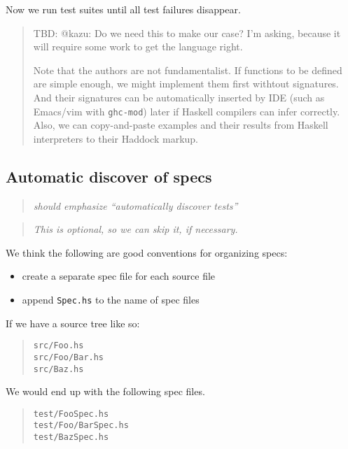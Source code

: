 \documentclass[preprint]{sigplanconf}
\begin{document}
\noindent Now we run test suites until
all test failures disappear.

\begin{quote}
    TBD: @kazu: Do we need this to make our case?  I'm asking, because
    it will require some work to get the language right.

    Note that the authors are not fundamentalist.  If functions to be
    defined are simple enough, we might implement them first withtout
    signatures.  And their signatures can be automatically inserted by
    IDE (such as Emacs/vim with {\tt ghc-mod}) later if Haskell
    compilers can infer correctly.  Also, we can copy-and-paste
    examples and their results from Haskell interpreters to their
    Haddock markup.
\end{quote}

\subsection{Automatic discover of specs}

\begin{quote}
    \emph{should emphasize ``automatically discover tests''}
\end{quote}

\begin{quote}
\emph{This is optional, so we can skip it, if necessary.}
\end{quote}

\noindent We think the following are good conventions for organizing specs:
\begin{itemize}
    \item create a separate spec file for each source file
    \item append {\tt Spec.hs} to the name of spec files
\end{itemize}

\noindent If we have a source tree like so:

\begin{quote}
\small
\begin{verbatim}
src/Foo.hs
src/Foo/Bar.hs
src/Baz.hs
\end{verbatim}
\end{quote}

\noindent We would end up with the following spec files.

\begin{quote}
\small
\begin{verbatim}
test/FooSpec.hs
test/Foo/BarSpec.hs
test/BazSpec.hs
\end{verbatim}
\end{quote}
\end{document}
